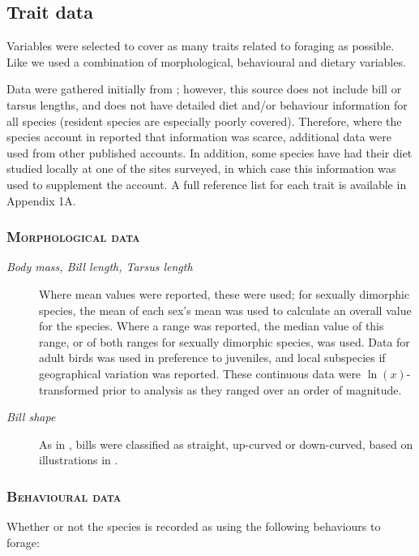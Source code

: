 \documentclass[12pt,a4paper]{book}
\begin{document}
\subsection{Trait data}	

Variables were selected to cover as many traits related to foraging as possible. Like \citet{Mendez2012} we used a combination of morphological, behavioural and dietary variables.

Data were gathered initially from \citet{DelHoyo2016}; however, this source does not include bill or tarsus lengths, and does not have detailed diet and/or behaviour information for all species (resident species are especially poorly covered). Therefore, where the species account in \citet{DelHoyo2016} reported that information was scarce, additional data were used from other published accounts. In addition, some species have had their diet studied locally at one of the sites surveyed, in which case this information was used to supplement the \citet{DelHoyo2016} account. A full reference list for each trait is available in Appendix 1A.


\subsubsection{\textsc{Morphological data}}

\begin{description}
\item[\textit{Body mass, Bill length, Tarsus length}] Where mean values were reported, these were used; for sexually dimorphic species, the mean of each sex's mean was used to calculate an overall value for the species. Where a range was reported, the median value of this range, or of both ranges for sexually dimorphic species, was used. Data for adult birds was used in preference to juveniles, and local subspecies if geographical variation was reported. These continuous data were $\ln(x)$-transformed prior to analysis as they ranged over an order of magnitude.
\item[\textit{Bill shape}] As in \citet{Mendez2012}, bills were classified as straight, up-curved or down-curved, based on illustrations in \citet{DelHoyo2016}.
\end{description}
\medskip
\subsubsection{\textsc{Behavioural data}} Whether or not the species is recorded as using the following behaviours to forage:
\end{document}
